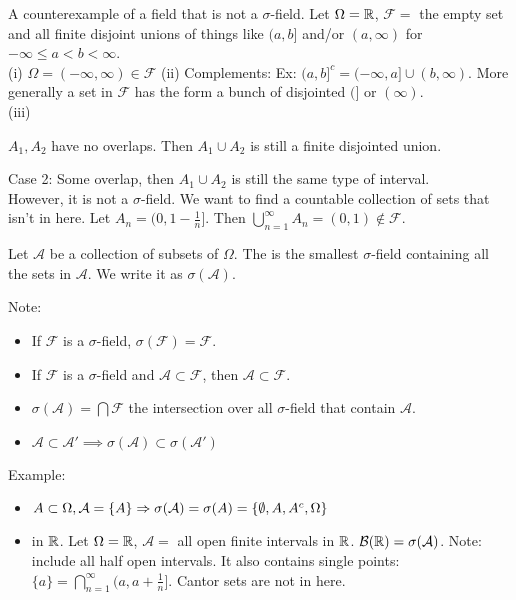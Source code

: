 \documentclass[class=article, crop=false]{standalone}
\begin{document}
A counterexample of a field that is not a $\sigma$-field.
Let $\Omega = \mathbb{R}$, $\mathcal{F}=$ the empty set and all finite disjoint unions of things like $(a,b]$ and/or  $(a,\infty)$ for $-\infty\leq a<b<\infty$.\\
(i) $\Omega=(-\infty,\infty) \in \mathcal{F}$
(ii) Complements: Ex: $(a,b]^{c} =(-\infty,a] \cup (b,\infty)$. More generally a set in $\mathcal{F}$ has the form a bunch of disjointed $(]$ or $(\infty)$. \\
(iii)\\ 
\begin{case}[1]
$A_1,A_2$ have no overlaps. Then $A_1 \cup A_2$ is still a finite disjointed union.
\end{case}
Case 2: Some overlap, then $A_1 \cup A_2$ is still the same type of interval.\\
However, it is not a $\sigma$-field. We want to find a countable collection of sets that isn't in here. Let $A_n=(0,1-\frac{1}{n}]$. Then $\bigcup_{n= 1}^{ \infty} A_n =(0,1) \not \in \mathcal{F} $.
\begin{defn}
	Let $\mathcal{A}$ be a collection of subsets of $\Omega$. The  is the smallest $\sigma$-field containing all the sets in $\mathcal{A}$. We write it as $\sigma(\mathcal{A})$.
\end{defn}

Note: 
\begin{itemize}
	\item If $\mathcal{F}$ is a $\sigma$-field, $\sigma(\mathcal{F})=\mathcal{F}$.
	\item If $\mathcal{F}$ is a $\sigma$-field and $\mathcal{A}\subset \mathcal{F}$, then $\mathcal{A} \subset \mathcal{F}$.
	\item $\sigma(\mathcal{A}) = \bigcap \mathcal{F}$ the intersection over all $\sigma$-field that contain $\mathcal{A}$.
	\item $\mathcal{A}\subset \mathcal{A}' \implies  \sigma(\mathcal{A}) \subset \sigma(\mathcal{A}')$ 
\end{itemize}

Example:
\begin{itemize}
	\item $A \subset \Omega, \mathcal{A}=\{A\} \Rightarrow \sigma(\mathcal{A})=\sigma(A)=\{\emptyset,A,A^{c},\Omega\}$
	\item {} in $\mathbb{R}$. Let $\Omega=\mathbb{R}$, $\mathcal{A}=$ all open finite intervals in $\mathbb{R}$. $\mathcal{B}(\mathbb{R})=\sigma(\mathcal{A})$. Note: include all half open intervals. It also contains single points: $\{a\}=\bigcap_{n= 1}^{ \infty} (a,a+\frac{1}{n}]$. Cantor sets are not in here. 
\end{itemize}
\end{document}
